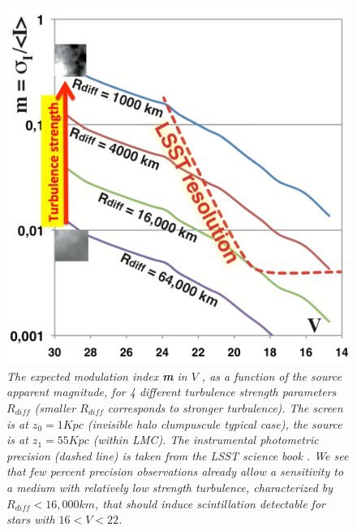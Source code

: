\documentclass[11pt]{article}
\begin{document}
\begin{figure}[h!]
\parbox{8.cm}{
\includegraphics[angle=0,scale=0.25]{sensitivity-LSST.pdf}
}
\hspace{0.3cm}
\parbox{8.cm}{
\caption{ \it
The expected modulation index {\bf m} in $V$ , as a function of the source
apparent magnitude, for 4 different turbulence strength parameters $R_{diff}$ (smaller $R_{diff}$
corresponds to stronger turbulence).
The screen is at $z_0=1Kpc$ (invisible halo clumpuscule typical case), the source is at
$z_1=55Kpc$ (within LMC).
The instrumental photometric precision (dashed line) is taken from the LSST science book \cite{sciencebook}.
We see that few percent precision observations already allow a sensitivity to a
medium with relatively low strength turbulence, characterized by $R_{diff} < 16,000 km$,
that should induce scintillation detectable for stars with $16 < V < 22$. }
\label{expectations}
}
\end{figure}
\end{document}

